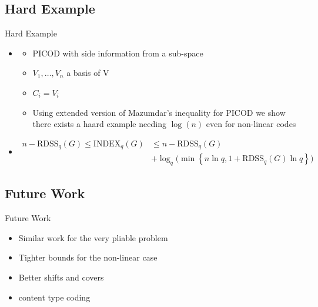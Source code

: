\documentclass[xcolor=dvipsnames, aspectratio=169]{beamer}
\newcommand{\set}[1]{\left\{ #1 \right\}}
\newcommand{\rdss}{\mathrm{RDSS}}
\newcommand{\indx}{\mathrm{INDEX}}
\begin{document}
\subsection{Hard Example}
\begin{frame}{Hard Example}
	\begin{itemize}
		\item<1->[]
			\begin{example}
				\begin{itemize}
					\item<1->[] PICOD with side information from a sub-space
					\item<2->[] $V_1, \ldots, V_n$ a basis of V
					\item<3->[] $C_i = V_i$
					\item<4->[] Using extended version of Mazumdar's inequality for PICOD we show there exists a haard example needing $\log(n)$ even for non-linear codes
				\end{itemize}
			\end{example}
		\item <5->[]
			\begin{theorem}[Mazumdar]
				\begin{align*}
					n - \rdss_q(G) \le \indx_q(G) &\le n -\rdss_q(G) \\
					&+ \log_q\Big(\min\set{n\ln q, 1+ \rdss_q(G)\ln q }\Big)
				\end{align*}
			\end{theorem}
	\end{itemize}
\end{frame}
\subsection{Future Work}
\begin{frame}{Future Work}
	\begin{itemize}
		\item<1-> Similar work for the very pliable problem
		\item<2-> Tighter bounds for the non-linear case
		\item<3-> Better shifts and covers
		\item<4-> content type coding
		
	\end{itemize}
\end{frame}

\end{document}
